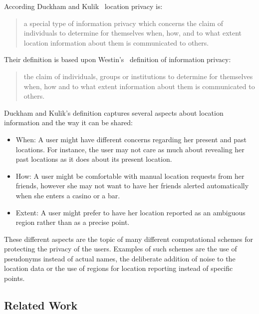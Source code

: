 According Duckham and Kulik~\cite{duckham2006location} location
privacy is:
\begin{quotation}
  a special type of information privacy which concerns the claim
  of individuals to determine for themselves when, how, and to what
  extent location information about them is communicated to others.
\end{quotation}
Their definition is based upon Westin's~\cite{westin1968privacy}
definition of information privacy:
\begin{quotation}
  the claim of individuals, groups or institutions to determine for
  themselves when, how and to what extent information about them is
  communicated to others.
\end{quotation}
Duckham and Kulik's definition captures several aspects about
location information and the way it can be shared:
\begin{itemize}
\item When: A user might have different concerns regarding her present
  and past locations. For instance, the user may not care as much
  about revealing her past locations as it does about its present
  location.
\item How: A user might be comfortable with manual location requests
  from her friends, however she may not want to have her friends
  alerted automatically when she enters a casino or a bar.  
\item Extent: A user might prefer to have her location reported as an
  ambiguous region rather than as a precise point.
\end{itemize}
These different aspects are the topic of many different
computational schemes for protecting the privacy of the users.
Examples of such schemes are the use of pseudonyms instead of actual
names, the deliberate addition of noise to the location data or the use
of regions for location reporting instead of specific points.

\subsection{Related Work}
\label{sec:lp_related_work}


